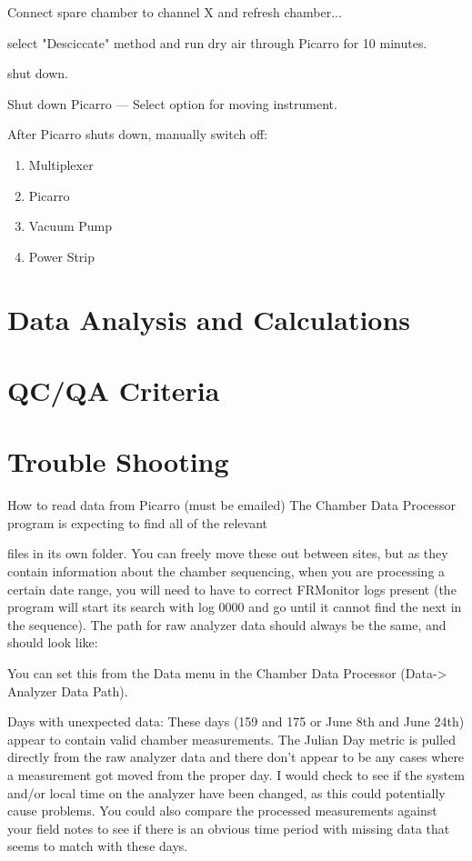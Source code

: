 \documentclass[12pt]{../SOP3}\usepackage[]{graphicx}\usepackage[]{color}
\begin{document}
\NP Connect spare chamber to channel X and refresh chamber... 
                               
\NP select "Desciccate" method and run dry air through Picarro for 10 minutes.
                               
\NP shut down.
                               
\NP Shut down Picarro --- Select option for moving instrument.
                               
\NP After Picarro shuts down, manually switch off:

\begin{enumerate}
  \item Multiplexer
  \item Picarro
  \item Vacuum Pump
  \item Power Strip
\end{enumerate}
                               
\section{Data Analysis and Calculations}


\section{QC/QA Criteria}


\section{Trouble Shooting}
How to read data from Picarro (must be emailed)
The Chamber Data Processor program is expecting to find all of the relevant 

files in its own folder. You can freely move these out between sites, but as they contain information about the chamber sequencing, when you are processing a certain date range, you will need to have to correct FRMonitor logs present (the program will start its search with log 0000 and go until it cannot find the next in the sequence). 
The path for raw analyzer data should always be the same, and should look like:  

You can set this from the Data menu in the Chamber Data Processor (Data-> Analyzer Data Path).

Days with unexpected data:  These days (159 and 175 or June 8th and June 24th) appear to contain valid chamber measurements. The Julian Day metric is pulled directly from the raw analyzer data and there don't appear to be any cases where a measurement got moved from the proper day. I would check to see if the system and/or local time on the analyzer have been changed, as this could potentially cause problems. You could also compare the processed measurements against your field notes to see if there is an obvious time period with missing data that seems to match with these days.
\end{document}
